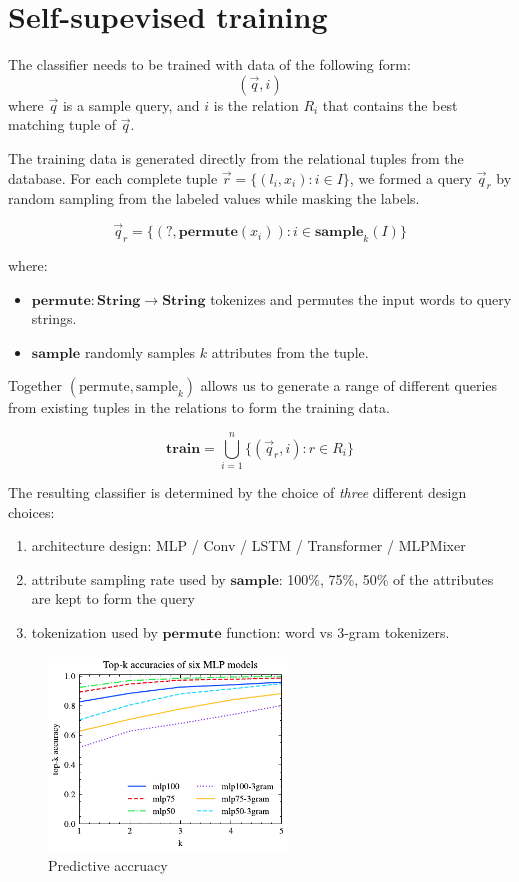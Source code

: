 \documentclass[conference]{IEEEtran}
\begin{document}
\section{Self-supevised training}

The classifier needs to be trained with data of the following form:
$$
(\vec q, i)
$$
where $\vec q$ is a sample query, and $i$ is the relation $R_i$ that contains the best matching
tuple of $\vec q$.

The training data is generated directly from the relational tuples from the database.  For each complete tuple $\vec r = \{(l_i, x_i): i\in I\}$, 
we formed a query $\vec q_r$ by random sampling from
the labeled values while masking the labels.

$$
\vec q_r = \{(?, \mathbf{permute}(x_i)): i\in\mathbf{sample}_k(I)\}
$$

where:
\begin{itemize}
\item $\mathbf{permute}:\mathbf{String}\to\mathbf{String}$
tokenizes and permutes the input words to query strings.
\item $\mathbf{sample}$ randomly samples $k$ attributes from the tuple.
\end{itemize}

Together $(\mathrm{permute}, \mathrm{sample}_k)$ allows us to generate
a range of different queries from existing tuples in the relations to form
the training data.

$$
\mathbf{train} = \bigcup_{i=1}^n\{(\vec q_r, i): r\in R_i\}
$$

The resulting classifier is determined by the choice of {\em three}
different design choices: 

\begin{enumerate}
\item architecture design: MLP / Conv / LSTM / Transformer / MLPMixer
\item attribute sampling rate used by $\mathbf{sample}$: 100\%, 75\%, 50\% of the attributes are kept to form the query
\item tokenization used by $\mathbf{permute}$ function: word vs 3-gram tokenizers.
\end{enumerate}



\begin{figure}[b]
	\centering
		\centering
		\includegraphics[width=2.5in]{graphics/top_k_mlp_A.pdf}
		\caption{Predictive accruacy}
		\label{fig:top_k_mlp_A}
\end{figure}
\end{document}
